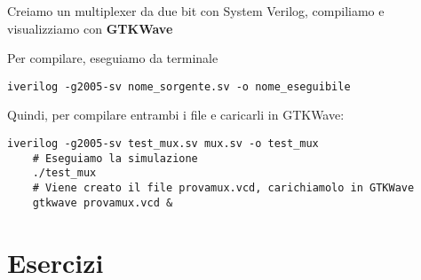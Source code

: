 \begin{exmp}
	Creiamo un multiplexer da due bit con System Verilog, compiliamo e
	visualizziamo con \textbf{GTKWave}
	
	
	Per compilare, eseguiamo da terminale
	\begin{lstlisting}[style={bash}]
	iverilog -g2005-sv nome_sorgente.sv -o nome_eseguibile
	\end{lstlisting}

	Quindi, per compilare entrambi i file e caricarli in GTKWave:
	\begin{lstlisting}[style={bash}]
	iverilog -g2005-sv test_mux.sv mux.sv -o test_mux
	# Eseguiamo la simulazione
	./test_mux
	# Viene creato il file provamux.vcd, carichiamolo in GTKWave
	gtkwave provamux.vcd &
	\end{lstlisting}
	
	
\end{exmp}



\clearpage

\section{Esercizi}


